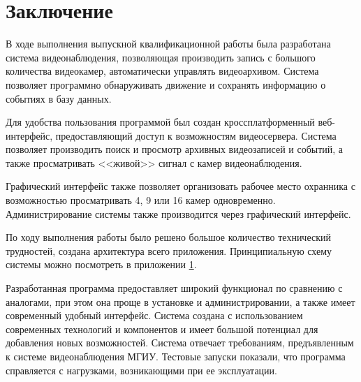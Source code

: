\chapter*{Заключение}

В ходе выполнения выпускной квалификационной работы была
разработана система видеонаблюдения, позволяющая
производить запись с большого количества видеокамер,
автоматически управлять видеоархивом.
Система позволяет программно обнаруживать движение и сохранять информацию
о событиях в базу данных.

Для удобства пользования программой был создан кроссплатформенный веб-интерфейс,
предоставляющий доступ к возможностям видеосервера. Система позволяет производить поиск
и просмотр архивных видеозаписей и событий, а также просматривать <<живой>> сигнал с камер
видеонаблюдения.

Графический интерфейс также позволяет организовать рабочее место охранника с возможностью
просматривать 4, 9 или 16 камер одновременно. Администрирование системы также производится
через графический интерфейс.

По ходу выполнения работы было решено большое количество технический трудностей,
создана архитектура всего приложения. Принципиальную схему системы можно посмотреть в приложении \hyperlink{scheme.1}{1}.

Разработанная программа предоставляет широкий функционал по сравнению с аналогами, при этом
она проще в установке и администрировании, а также имеет современный удобный интерфейс.
Система создана с использованием современных технологий и компонентов и имеет большой
потенциал для добавления новых возможностей.
Система отвечает требованиям, предъявленным к системе видеонаблюдения МГИУ.
Тестовые запуски показали, что программа справляется с нагрузками, возникающими при ее эксплуатации.
